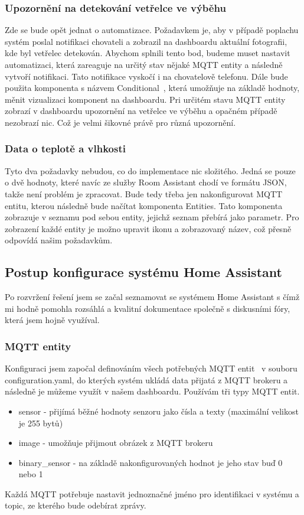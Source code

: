\subsubsection*{Upozornění na detekování vetřelce ve výběhu}
Zde se bude opět jednat o automatizace.
Požadavkem je, aby v případě poplachu systém poslal notifikaci chovateli a zobrazil na dashboardu aktuální fotografii, kde byl vetřelec detekován.\newline
Abychom splnili tento bod, budeme muset nastavit automatizaci, která zareaguje na určitý stav nějaké MQTT entity a následně vytvoří notifikaci.
Tato notifikace vyskočí i na chovatelově telefonu.
Dále bude použita komponenta s názvem Conditional~\cite{HomeAssistantConditionalCard}, která umožňuje na základě hodnoty, měnit vizualizaci komponent na dashboardu.
Pri určitém stavu MQTT entity zobrazí v dashboardu upozornění na vetřelce ve výběhu a opačném případě nezobrazí nic.
Což je velmi šikovné právě pro různá upozornění.

\subsubsection*{Data o teplotě a vlhkosti}
Tyto dva požadavky nebudou, co do implementace nic složitého.
Jedná se pouze o dvě hodnoty, které navíc ze služby Room Assistant chodí ve formátu JSON, takže není problém je zpracovat.\newline
Bude tedy třeba jen nakonfigurovat MQTT entitu, kterou následně bude načítat komponenta Entities.
Tato komponenta zobrazuje v seznamu pod sebou entity, jejichž seznam přebírá jako parametr.
Pro zobrazení každé entity je možno upravit ikonu a zobrazovaný název, což přesně odpovídá našim požadavkům.

\subsection{Postup konfigurace systému Home Assistant}
Po rozvržení řešení jsem se začal seznamovat se systémem Home Assistant s čímž mi hodně pomohla rozsáhlá a kvalitní dokumentace společně s diskusními fóry, která jsem hojně využíval.
\subsubsection*{MQTT entity}
Konfiguraci jsem započal definováním všech potřebných MQTT entit~\cite{HomeAssistantMQTT, HomeAssistantEntities} v souboru configuration.yaml, do kterých systém ukládá data přijatá z MQTT brokeru a následně je můžeme využít v našem dashboardu.
Používám tři typy MQTT entit.
\begin{itemize}
    \item sensor - přijímá běžné hodnoty senzoru jako čísla a texty (maximální velikost je 255 bytů)
    \item image - umožňuje přijmout obrázek z MQTT brokeru
    \item binary\_sensor - na základě nakonfigurovaných hodnot je jeho stav buď 0 nebo 1
\end{itemize}
Každá MQTT potřebuje nastavit jednoznačné jméno pro identifikaci v systému a topic, ze kterého bude odebírat zprávy.

